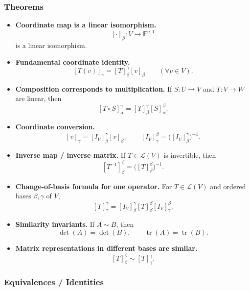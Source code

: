 \subsubsection*{Theorems}

\begin{itemize}[leftmargin=*]
\item \textbf{Coordinate map is a linear isomorphism.}
\[
[\cdot]_\beta:V\to \mathbb F^{n,1}
\]
is a linear isomorphism.

\item \textbf{Fundamental coordinate identity.}
\[
[T(v)]_\gamma=[T]^{\gamma}_{\beta}[v]_\beta
\qquad(\forall v\in V).
\]

\item \textbf{Composition corresponds to multiplication.} If $S:U\to V$ and $T:V\to W$ are linear, then
\[
[T\circ S]^{\gamma}_{\alpha}=[T]^{\gamma}_{\beta}[S]^{\beta}_{\alpha}.
\]

\item \textbf{Coordinate conversion.}
\[
[v]_\gamma=[I_V]^{\gamma}_{\beta}[v]_\beta,
\qquad
[I_V]^{\beta}_{\gamma}=\bigl([I_V]^{\gamma}_{\beta}\bigr)^{-1}.
\]

\item \textbf{Inverse map / inverse matrix.} If $T\in\mathcal L(V)$ is invertible, then
\[
[T^{-1}]^{\beta}_{\beta}=\bigl([T]^{\beta}_{\beta}\bigr)^{-1}.
\]

\item \textbf{Change-of-basis formula for one operator.} For $T\in\mathcal L(V)$ and ordered bases $\beta,\gamma$ of $V$,
\[
[T]^{\gamma}_{\gamma}=[I_V]^{\gamma}_{\beta}[T]^{\beta}_{\beta}[I_V]^{\beta}_{\gamma}.
\]

\item \textbf{Similarity invariants.} If $A\sim B$, then
\[
\det(A)=\det(B),
\qquad
\operatorname{tr}(A)=\operatorname{tr}(B).
\]

\item \textbf{Matrix representations in different bases are similar.}
\[
[T]^{\beta}_{\beta}\sim [T]^{\gamma}_{\gamma}.
\]
\end{itemize}

\subsubsection*{Equivalences / Identities}


